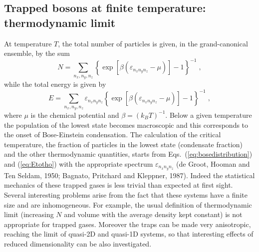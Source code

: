 \subsection{Trapped bosons at finite temperature: thermodynamic limit}
\label{sec:thermodynamiclimit}

At temperature $T$, the total number of particles is given, in the
grand-canonical ensemble,  by the sum
\begin{equation}
N= \sum_{n_x,n_y,n_z} \left\{ \exp [ \beta
(\varepsilon_{n_x n_y n_z} - \mu )] -1 \right\}^{-1} \;,
\label{eq:bosedistribution}
\end{equation}
while the total energy is given by
\begin{equation}
E=\sum_{n_x,n_y,n_z} \varepsilon_{n_x n_y n_z} \left\{ \exp [ \beta
(\varepsilon_{n_x n_y n_z} - \mu )] -1 \right\}^{-1} \;,
\label{eq:Etotho}
\end{equation}
where $\mu$ is the chemical potential and $\beta= (k_BT)^{-1}$.
Below a given temperature the population of the lowest state becomes
macroscopic and this corresponds to the onset of  Bose-Einstein
condensation. The calculation of the critical temperature, the fraction
of particles in the  lowest state (condensate fraction) and the other
thermodynamic quantities, starts from  Eqs.~(\ref{eq:bosedistribution}) 
and (\ref{eq:Etotho}) with the appropriate spectrum 
$\varepsilon_{n_x n_y n_z}$ (de Groot, Hooman and Ten Seldam, 1950; 
Bagnato, Pritchard and Kleppner, 1987).  Indeed the
statistical mechanics of these trapped gases is less trivial
than expected at first sight. Several interesting problems
arise from the fact that these systems have a finite size and
are inhomogeneous. For example, the usual definition 
of thermodynamic limit (increasing $N$ and volume with the average
density kept constant) is not appropriate for trapped gases. 
Moreover the traps can be made very anisotropic, reaching
the limit of  quasi-2D and quasi-1D systems, so that interesting
effects of reduced dimensionality can be also investigated.

